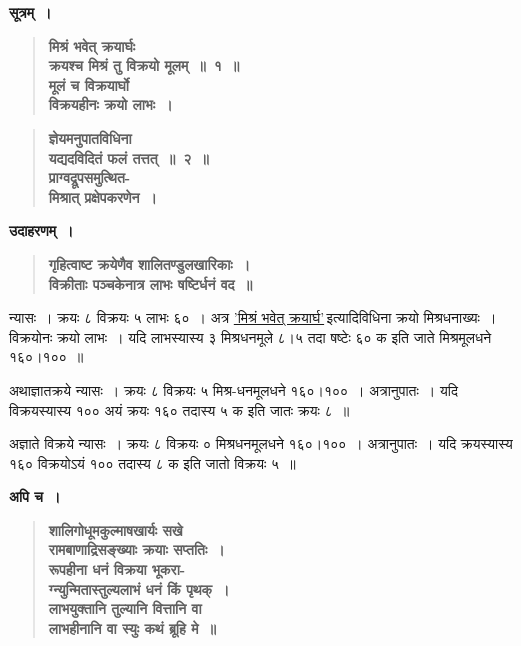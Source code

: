 \documentclass[11pt, openany]{book}
\begin{document}
\noindent \textbf{सूत्रम्~।}

 \label{2.1}
\begin{quote}
{\large \textbf{{\color{purple}मिश्रं भवेत् क्रयार्घः \\
क्रयश्च मिश्रं तु विक्रयो मूलम्~॥~१~॥ \\
मूलं च विक्रयार्घो \\
विक्रयहीनः क्रयो लाभः~।}}}
\end{quote}

\newpage

 \label{2.2}
\begin{quote}
{\large \textbf{{\color{purple}ज्ञेयमनुपातविधिना \\
यद्यदविदितं फलं तत्तत्~॥~२~॥ \\
प्राग्वद्रूपसमुत्थित-\\
मिश्रात् प्रक्षेपकरणेन~।}}}
\end{quote}

\noindent \textbf{उदाहरणम्~।}

 \label{Ex 2.4}
\begin{quote}
\textbf{{\color{red}गृहित्वाष्ट क्रयेणैव शालितण्डुलखारिकाः~।\\
विक्रीताः पञ्चकेनात्र लाभः षष्टिर्धनं वद~॥}}
\end{quote}

\begin{sloppypar}
न्यासः~। क्रयः ८ विक्रयः ५ लाभः ६०~। अत्र \hyperref[2.1]{'मिश्रं भवेत् क्रयार्घ'}\textendash \,इत्यादिविधिना क्रयो मिश्रधनाख्यः~। विक्रयोनः क्रयो लाभः~। यदि लाभस्यास्य ३ मिश्रधनमूले ८।५ तदा षष्टेः ६० क इति जाते मिश्रमूलधने १६०।१००~॥
\vspace{3mm}

अथाज्ञातक्रये न्यासः~। क्रयः ८ विक्रयः ५ मिश्र-धनमूलधने १६०।१००~। अत्रानुपातः~। यदि विक्रयस्यास्य १०० अयं क्रयः १६० तदास्य ५ क इति जातः क्रयः ८~॥
\vspace{3mm}

अज्ञाते विक्रये न्यासः~। क्रयः ८ विक्रयः ० मिश्रधनमूलधने १६०।१००~। अत्रानुपातः~। यदि क्रयस्यास्य १६० विक्रयोऽयं १०० तदास्य ८ क इति जातो विक्रयः ५~॥\\
\end{sloppypar}

\noindent \textbf{अपि च~।}

 \label{Ex 2.5}
\begin{quote}
\textbf{{\color{red}शालिगोधूमकुल्माषखार्यः सखे \\
रामबाणाद्रिसङ्ख्याः क्रयाः सप्ततिः~।\\
रूपहीना धनं विक्रया भूकरा-\\
ग्न्युन्मितास्तुल्यलाभं धनं किं पृथक्~।\\
लाभयुक्तानि तुल्यानि वित्तानि वा \\
लाभहीनानि वा स्युः कथं ब्रूहि मे~॥}}
\end{quote}
\end{document}

